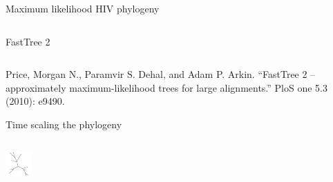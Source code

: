 \documentclass{beamer}
\begin{document}
\begin{frame}{Maximum likelihood HIV phylogeny}
\begin{columns}
\begin{column}{0.5\textwidth}
{            FastTree 2
            }
        \end{column}
    \end{columns}

    \tiny
    Price, Morgan N., Paramvir S. Dehal, and Adam P. Arkin. ``FastTree
    2 -- approximately maximum-likelihood trees for large alignments.'' PloS one
    5.3 (2010): e9490.\par
\end{frame}

\begin{frame}{Time scaling the phylogeny}

    \begin{columns}
        \begin{column}{0.5\textwidth}
            \centering
            \includegraphics[height=1cm]{unrooted}


\end{column}
\end{columns}
\end{frame}
\end{document}
